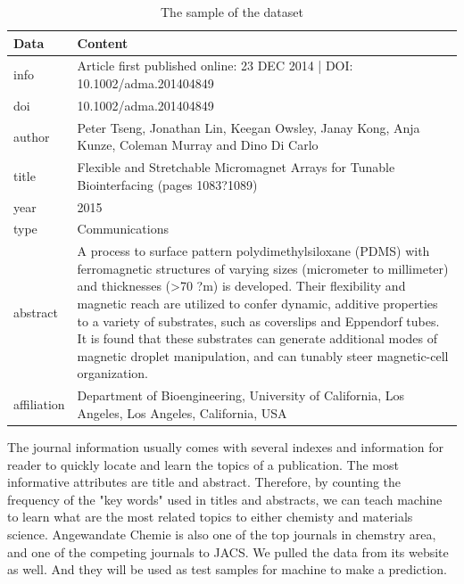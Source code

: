 \documentclass[conference]{IEEEtran}
\begin{document}
\begin{table}
    \caption{The sample of the dataset\label{tab:data-sample}}
    \begin{center}
        \begin{tabular}{ p{1cm} | p{6cm} }
            \hline
            \bf{Data} & \bf{Content}\\
            \hline
            info & Article first published online: 23 DEC 2014 | DOI: 10.1002/adma.201404849\\
            \hline
            doi & 10.1002/adma.201404849\\
            \hline
            author & Peter Tseng, Jonathan Lin, Keegan Owsley, Janay Kong, Anja Kunze, Coleman Murray and Dino Di Carlo \\
            \hline
            title & Flexible and Stretchable Micromagnet Arrays for Tunable Biointerfacing (pages 1083?1089) \\
            \hline
            year & 2015 \\
            \hline
            type & Communications \\
            \hline
            abstract & A process to surface pattern polydimethylsiloxane (PDMS) with ferromagnetic structures of varying sizes (micrometer to millimeter) and thicknesses (>70 ?m) is developed. Their flexibility and magnetic reach are utilized to confer dynamic, additive properties to a variety of substrates, such as coverslips and Eppendorf tubes. It is found that these substrates can generate additional modes of magnetic droplet manipulation, and can tunably steer magnetic-cell organization.\\
            \hline
            affiliation & Department of Bioengineering, University of California, Los Angeles, Los Angeles, California, USA\\
            \hline
        \end{tabular}
    \end{center}
\end{table}

The journal information usually comes with several indexes and information for reader to quickly locate and learn the topics of a publication. The most informative attributes are title and abstract. Therefore, by counting the frequency of the "key words" used in titles and abstracts, we can teach machine to learn what are the most related topics to either chemisty and materials science. Angewandate Chemie is also one of the top journals in chemstry area, and one of the competing journals to JACS. We pulled the data from its website as well. And they will be used as test samples for machine to make a prediction.
\end{document}
